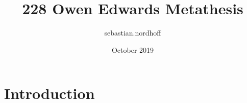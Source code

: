 \documentclass{article}
\title{228 Owen Edwards Metathesis}
\author{sebastian.nordhoff }
\date{October 2019}
\begin{document}
\maketitle

\section{Introduction}
\end{document}
